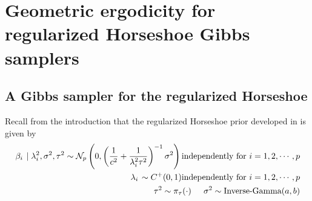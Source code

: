 \documentclass[noinfoline,11pt]{imsart}
\numberwithin{equation}{section}
\theoremstyle{plain}
\newcommand\Myciteauthor[1]{\citeauthor{#1} \cite{#1}}
\begin{document}
\iffalse
\begin{figure}[hbt!]
     \centering
     \begin{subfigure}[b]{0.49\textwidth}
         \centering
         \texttt{[image: fig/ACF\_JPAMethod\_MC\_LD\_8.pdf]}
         \caption{Acf of $\beta^T\beta$  for JOB  sampler when p=1500.}
         \label{fig:JOB_p_1500_acf}
     \end{subfigure}
     \vspace{.01in}
     \begin{subfigure}[b]{0.49\textwidth}
         \centering
         \texttt{[image: fig/PropMethod\_MC\_LD\_8.pdf]}
         \caption{Acf of $\beta^T\beta$ for proposed sampler when p=1500.}
         \label{fig:prop_p_1500_acf}
     \end{subfigure}\\
     \begin{subfigure}[b]{0.49\textwidth}
         \centering
         \texttt{[image: fig/ACF\_JPAMethod\_MC\_SD\_18.pdf]}
         \caption{Acf of $\beta^T\beta$  for JOB  sampler when p=1000.}
         \label{fig:JOB_p_1000_acf}
     \end{subfigure}
     \vspace{.01in}
     \begin{subfigure}[b]{0.49\textwidth}
         \centering
         \texttt{[image: fig/PropMethod\_MC\_SD\_18.pdf]}
         \caption{Acf of $\beta^T\beta$ for proposed sampler when p=1000.}
         \label{fig:prop_p_1000_acf}
     \end{subfigure}
     \hfill
     \caption{Auto-correlation plots for the function $\boldsymbol{\beta}^T\boldsymbol{\beta}$ for different simulation cases. }
     \label{fig:p_acf}
  \end{figure}
  
\fi



\section{Geometric ergodicity for regularized Horseshoe Gibbs samplers}

\subsection{A Gibbs sampler for the regularized Horseshoe }
\label{Regularized:Gibbs:sampler}

\noindent
Recall from the introduction that the regularized Horseshoe prior  
developed in \Myciteauthor{piironen2017} is given by 
\begin{eqnarray}
\left.\beta_i \right. \mid \lambda_i^2, \sigma^2,\tau^2\sim \mathcal{N}_p \left( 0, \left( \frac{1}{c^2} + \frac{1}{\lambda_i^2 \tau^2} \right)^{-1} \sigma^2 \right) \text{independently for}\ i=1,2,\cdots,p \nonumber\\
\left.\lambda_i\right.\sim C^+ (0,1) \text{independently for}\ i=1,2,\cdots,p \nonumber\\
\tau^2\sim \pi_\tau (\cdot) \hspace{0.2in} \sigma^2\sim 
\text{Inverse-Gamma}(a,b) \label{regularized_prior}
\end{eqnarray}
\end{document}
